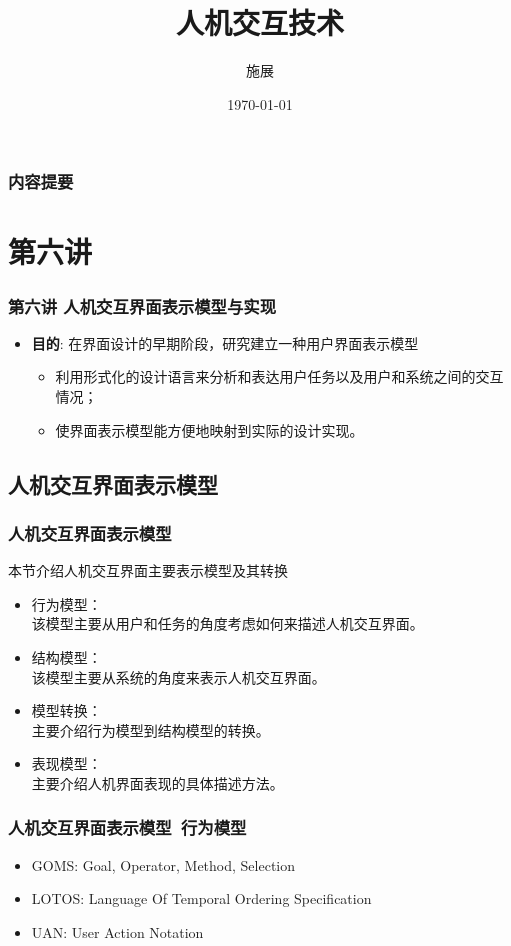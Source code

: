 \documentclass{beamer}
\title{人机交互技术}
\author{施展}
\institute{华中科技大学~武汉光电国家实验室}
\date{\today}
\begin{document}
\begin{frame}
	\titlepage
\end{frame}

\begin{frame}
	\frametitle{内容提要}
	\tableofcontents
\end{frame}

\section{第六讲}
\begin{frame}
	\frametitle{第六讲 人机交互界面表示模型与实现}
	\begin{itemize}
		\item \textbf{目的}: 在界面设计的早期阶段，研究建立一种用户界面表示模型
		\begin{itemize}
			\item 利用形式化的设计语言来分析和表达用户任务以及用户和系统之间的交互情况；
			\item 使界面表示模型能方便地映射到实际的设计实现。
		\end{itemize}
	\end{itemize}
\end{frame}

\subsection{人机交互界面表示模型}
\begin{frame}
	\frametitle{人机交互界面表示模型}
	\beamertemplatetransparentcovereddynamicmedium
	本节介绍人机交互界面主要表示模型及其转换
	\begin{itemize}
		\item 行为模型：\\{\tiny 该模型主要从用户和任务的角度考虑如何来描述人机交互界面。}
		\item 结构模型：\\{\tiny 该模型主要从系统的角度来表示人机交互界面。}
		\item 模型转换：\\{\tiny 主要介绍行为模型到结构模型的转换。}
		\item 表现模型：\\{\tiny 主要介绍人机界面表现的具体描述方法。}
	\end{itemize}
\end{frame}

\begin{frame}
	\frametitle{人机交互界面表示模型~{\small 行为模型}}
	\begin{itemize}
		\item GOMS: Goal, Operator, Method, Selection 
		\item LOTOS: Language Of Temporal Ordering Specification
		\item UAN: User Action Notation
	\end{itemize}
\end{frame}
\end{document}
